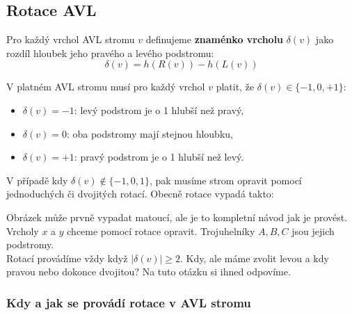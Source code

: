\subsection{Rotace AVL}

\begin{definition}
    Pro každý vrchol AVL stromu $v$ definujeme \textbf{znaménko vrcholu} $\delta(v)$ jako rozdíl hloubek jeho pravého a levého podstromu:
    $$\delta(v) = h(R(v)) - h(L(v))$$
\end{definition} \medskip

\begin{definition}
V platném AVL stromu musí pro každý vrchol $v$ platit, že $\delta(v) \in \{-1, 0, +1\}$:
\begin{itemize}[itemsep=-0.2em]
    \item $\delta(v) = -1$: levý podstrom je o 1 hlubší než pravý,
    \item $\delta(v) = 0$: oba podstromy mají stejnou hloubku,
    \item $\delta(v) = +1$: pravý podstrom je o 1 hlubší než levý.
\end{itemize}    
\end{definition} \bigskip


\noindent V případě kdy $\delta(v) \notin \{-1, 0, 1\}$, pak musíme strom opravit pomocí jednoduchých či dvojitých rotací. Obecně rotace vypadá takto: \bigskip

 \bigskip

\noindent Obrázek může prvně vypadat matoucí, ale je to kompletní návod jak je provést. Vrcholy $x$ a $y$ chceme pomocí rotace opravit. Trojuhelníky $A,B,C$ jsou jejich podstromy. \\

\noindent Rotací provádíme vždy když $|\delta(v)| \geq 2$. Kdy, ale máme zvolit levou a kdy pravou nebo dokonce dvojitou? Na tuto otázku si ihned odpovíme. \bigskip


\newcommand{\deltaVal}[1]{\delta(#1)}

\subsubsection{Kdy a jak se provádí rotace v AVL stromu}


